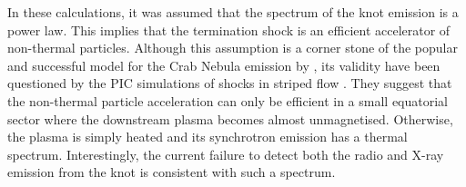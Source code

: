 In these calculations, it was assumed that the spectrum of the knot emission is a power law. This implies that the termination shock is an efficient accelerator of non-thermal particles. Although this assumption is a corner stone of the popular and successful model for the Crab Nebula emission by \citet{kc84b}, its validity have been questioned by the PIC simulations of shocks in striped flow \citep{SS-11}. They suggest that the non-thermal particle acceleration can only be efficient in a small equatorial sector where the downstream plasma becomes almost unmagnetised.  Otherwise, the plasma is simply heated and its synchrotron emission has a thermal spectrum.  Interestingly, the current failure to detect both the radio and X-ray emission from the knot  is consistent with such a spectrum.      
